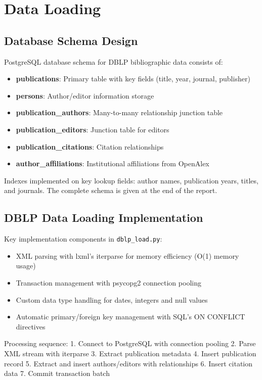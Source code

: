\section{Data Loading}

\subsection{Database Schema Design}
PostgreSQL database schema for DBLP bibliographic data consists of:

\begin{itemize}
    \item \textbf{publications}: Primary table with key fields (title, year, journal, publisher)
    \item \textbf{persons}: Author/editor information storage
    \item \textbf{publication\_authors}: Many-to-many relationship junction table
    \item \textbf{publication\_editors}: Junction table for editors
    \item \textbf{publication\_citations}: Citation relationships
    \item \textbf{author\_affiliations}: Institutional affiliations from OpenAlex
\end{itemize}

Indexes implemented on key lookup fields: author names, publication years, titles, and journals. The complete schema is given at the end of the report.

\subsection{DBLP Data Loading Implementation}
Key implementation components in \texttt{dblp\_load.py}:

\begin{itemize}
    \item XML parsing with lxml's iterparse for memory efficiency (O(1) memory usage)
    \item Transaction management with psycopg2 connection pooling
    \item Custom data type handling for dates, integers and null values
    \item Automatic primary/foreign key management with SQL's ON CONFLICT directives
\end{itemize}

Processing sequence:
1. Connect to PostgreSQL with connection pooling
2. Parse XML stream with iterparse
3. Extract publication metadata
4. Insert publication record
5. Extract and insert authors/editors with relationships
6. Insert citation data
7. Commit transaction batch

